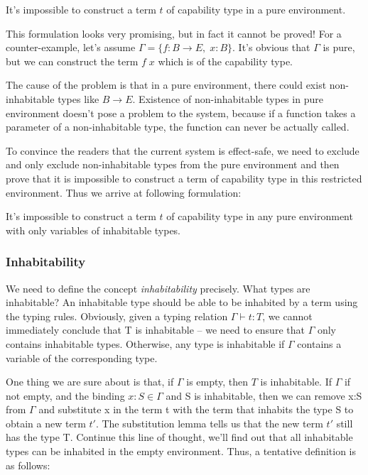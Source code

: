 \begin{definition}
  It's impossible to construct a term $t$ of capability type in a pure
  environment.
\end{definition}

This formulation looks very promising, but in fact it cannot be proved!
For a counter-example, let's assume $\Gamma = \{f: B \to E, \; x:
B\}$. It's obvious that $\Gamma$ is pure, but we can construct the
term $f \; x$ which is of the capability type.

The cause of the problem is that in a pure environment, there could
exist non-inhabitable types like $B \to E$.  Existence of
non-inhabitable types in pure environment doesn't pose a problem to
the system, because if a function takes a parameter of a
non-inhabitable type, the function can never be actually called.

To convince the readers that the current system is effect-safe, we
need to exclude and only exclude non-inhabitable types from the pure
environment and then prove that it is impossible to construct a term
of capability type in this restricted environment. Thus we arrive at
following formulation:

\begin{definition}
  It's impossible to construct a term $t$ of capability type in any
  pure environment with only variables of inhabitable types.
\end{definition}

\subsubsection{Inhabitability}

We need to define the concept \emph{inhabitability} precisely. What
types are inhabitable? An inhabitable type should be able to be
inhabited by a term using the typing rules. Obviously, given a typing
relation $\Gamma \vdash t: T$, we cannot immediately conclude that T
is inhabitable -- we need to ensure that $\Gamma$ only contains
inhabitable types. Otherwise, any type is inhabitable if $\Gamma$
contains a variable of the corresponding type.

One thing we are sure about is that, if $\Gamma$ is empty, then $T$ is
inhabitable. If $\Gamma$ if not empty, and the binding
$x:S \in \Gamma$ and S is inhabitable, then we can remove x:S from
$\Gamma$ and substitute x in the term t with the term that inhabits
the type S to obtain a new term $t'$. The substitution lemma tells us
that the new term $t'$ still has the type T. Continue this line of
thought, we'll find out that all inhabitable types can be inhabited in
the empty environment. Thus, a tentative definition is as follows:

